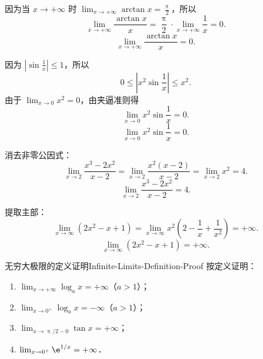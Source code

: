 \begin{solution}

    因为当 $x \to +\infty$ 时 $\lim_{x\to +\infty} \arctan x = \frac{\uppi}{2}$，所以
    \begin{equation}
        \lim_{x\to +\infty} \frac{\arctan x}{x} = \frac{\uppi}{2} \cdot \lim_{x\to +\infty} \frac{1}{x} = 0.
    \end{equation}
    \begin{equation}
        \boxed{\lim_{x\to +\infty} \frac{\arctan x}{x} = 0.}
    \end{equation}


    因为 $\left| \sin \frac{1}{x} \right| \leqslant 1$，所以
    \begin{equation}
        0 \leqslant \left| x^2 \sin \frac{1}{x} \right| \leqslant x^2.
    \end{equation}
    由于 $\lim_{x\to 0} x^2 = 0$，由夹逼准则得
    \begin{equation}
        \lim_{x\to 0} x^2 \sin \frac{1}{x} = 0.
    \end{equation}
    \begin{equation}
        \boxed{\lim_{x\to 0} x^2 \sin \frac{1}{x} = 0.}
    \end{equation}


    消去非零公因式：
    \begin{equation}
        \lim_{x\to 2} \frac{x^3 - 2x^2}{x - 2} = \lim_{x\to 2} \frac{x^2(x - 2)}{x - 2} = \lim_{x\to 2} x^2 = 4.
    \end{equation}
    \begin{equation}
        \boxed{\lim_{x\to 2} \frac{x^3 - 2x^2}{x - 2} = 4.}
    \end{equation}


    提取主部：
    \begin{equation}
        \lim_{x\to\infty} (2x^2 - x + 1) = \lim_{x\to\infty} x^2 \left( 2 - \frac{1}{x} + \frac{1}{x^2} \right) = +\infty.
    \end{equation}
    \begin{equation}
        \boxed{\lim_{x\to\infty} (2x^2 - x + 1) = +\infty.}
    \end{equation}
\end{solution}

\begin{problem}{无穷大极限的定义证明}{Infinite-Limits-Definition-Proof}
    按定义证明：
    \begin{enumerate}
        \item $\lim_{x\to +\infty} \log_a x = +\infty$（$a > 1$）；
        \item $\lim_{x\to 0^+} \log_a x = -\infty$（$a > 1$）；
        \item $\lim_{x\to \uppi/2-0} \tan x = +\infty$；
        \item $\lim_{x\to 0^+} \e^{1/x} = +\infty$．
    \end{enumerate}
\end{problem}

